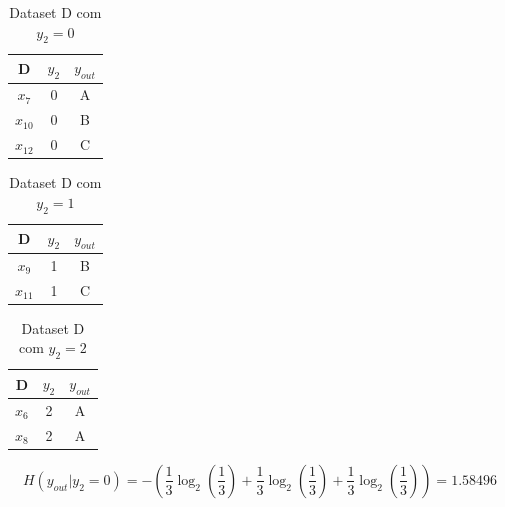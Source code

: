 \documentclass{article}
\begin{document}
\begin{center}
\begin{minipage}[b]{0.3\linewidth}
  \centering
  \begin{table}[H]
    \centering
    \begin{tabular}{|c|c|c|}
        \hline
        D     & $y_2$ & $y_{out}$ \\ \hline
        $x_7$ & 0     & A         \\ \hline
        $x_{10}$ & 0     & B         \\ \hline
        $x_{12}$ & 0     & C         \\ \hline
    \end{tabular}
    \caption{Dataset D com $y_2 = 0$}
    \label{tab:datasetDy2=0}
  \end{table}
\end{minipage}
\begin{minipage}[b]{0.3\linewidth}
  \centering
  \begin{table}[H]
    \centering
    \begin{tabular}{|c|c|c|}
      \hline
        D     & $y_2$ & $y_{out}$ \\ \hline
        $x_9$ & 1     & B         \\ \hline
        $x_{11}$ & 1     & C         \\ \hline
    \end{tabular}
    \caption{Dataset D com $y_2 = 1$}
    \label{tab:datasetDy2=1}
  \end{table}
\end{minipage}
\begin{minipage}[b]{0.3\linewidth}
  \centering
  \begin{table}[H]
    \centering
    \begin{tabular}{|c|c|c|}
    \hline
        D     & $y_2$ & $y_{out}$ \\ \hline
        $x_6$ & 2     & A         \\ \hline
        $x_8$ & 2     & A         \\ \hline
    \end{tabular}
    \caption{Dataset D com $y_2 = 2$}
    \label{tab:datasetDy2=2}
  \end{table}
\end{minipage}
\end{center}

\[ H(y_{out}|y_2 = 0) = - \left( \frac{1}{3} \log_2 \left( \frac{1}{3} \right) + \frac{1}{3} \log_2 \left( \frac{1}{3} \right) + \frac{1}{3} \log_2 \left( \frac{1}{3} \right) \right) = 1.58496 \]
\end{document}
